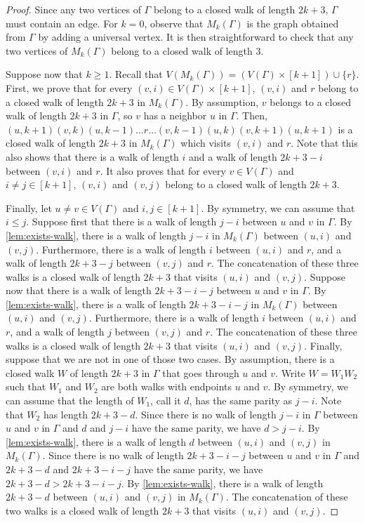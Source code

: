 \documentclass{article}
\begin{document}
\begin{proof}
    Since any two vertices of $\Gamma$ belong to a closed walk of length $2k+3$, $\Gamma$ must contain an edge.
    For $k = 0$, observe that $M_k(\Gamma)$ is the graph obtained from $\Gamma$ by adding a universal vertex. It is then straightforward to check that any two vertices of $M_k(\Gamma)$ belong to a closed walk of length $3$.

    Suppose now that $k \geq 1$. 
    Recall that $V(M_k(\Gamma)) = (V(\Gamma) \times [k+1]) \cup \{r\}$.
    First, we prove that for every $(v, i) \in V(\Gamma) \times [k+1]$, $(v, i)$ and $r$ belong to a closed walk of length $2k+3$ in $M_{k}(\Gamma)$.
    By assumption, $v$ belongs to a closed walk of length $2k+3$ in $\Gamma$, so $v$ has a neighbor $u$ in $\Gamma$.
    Then, $(u, k+1)(v, k)(u, k-1)\ldots r\ldots(v, k-1)(u, k)(v, k+1)(u, k+1)$ is a closed walk of length $2k+3$ in $M_k(\Gamma)$ which visits $(v, i)$ and $r$.
    Note that this also shows that there is a walk of length $i$ and a walk of length $2k+3-i$ between $(v, i)$ and $r$.
    It also proves that for every $v \in V(\Gamma)$ and $i \neq j \in [k+1]$, $(v, i)$ and $(v, j)$ belong to a closed walk of length $2k+3$.
    
    Finally, let $u \neq v \in V(\Gamma)$ and $i, j \in [k+1]$.
    By symmetry, we can assume that $i \leq j$.
    Suppose first that there is a walk of length $j-i$ between $u$ and $v$ in $\Gamma$.
    By \cref{lem:exists-walk}, there is a walk of length $j-i$ in $M_k(\Gamma)$ between $(u, i)$ and $(v, j)$.
    Furthermore, there is a walk of length $i$ between $(u, i)$ and $r$, and a walk of length $2k+3-j$ between $(v, j)$ and $r$. 
    The concatenation of these three walks is a closed walk of length $2k+3$ that visits $(u, i)$ and $(v, j)$.
    Suppose now that there is a walk of length $2k+3-i-j$ between $u$ and $v$ in $\Gamma$.
    By \cref{lem:exists-walk}, there is a walk of length $2k+3-i-j$ in $M_k(\Gamma)$ between $(u, i)$ and $(v, j)$.
    Furthermore, there is a walk of length $i$ between $(u, i)$ and $r$, and a walk of length $j$ between $(v, j)$ and $r$. 
    The concatenation of these three walks is a closed walk of length $2k+3$ that visits $(u, i)$ and $(v, j)$.
    Finally, suppose that we are not in one of those two cases.
    By assumption, there is a closed walk $W$ of length $2k+3$ in $\Gamma$ that goes through $u$ and $v$.
    Write $W = W_1W_2$ such that $W_1$ and $W_2$ are both walks with endpoints $u$ and $v$.
    By symmetry, we can assume that the length of $W_1$, call it $d$, has the same parity as $j-i$. Note that $W_2$ has length $2k+3-d$.
    Since there is no walk of length $j-i$ in $\Gamma$ between $u$ and $v$ in $\Gamma$ and $d$ and $j-i$ have the same parity, we have $d > j-i$.
    By \cref{lem:exists-walk}, there is a walk of length $d$ between $(u, i)$ and $(v, j)$ in $M_k(\Gamma)$.
    Since there is no walk of length $2k+3-i-j$ between $u$ and $v$ in $\Gamma$ and $2k+3-d$ and $2k+3-i-j$ have the same parity, we have $2k+3-d > 2k+3-i-j$.
    By \cref{lem:exists-walk}, there is a walk of length $2k+3-d$ between $(u, i)$ and $(v, j)$ in $M_k(\Gamma)$.
    The concatenation of these two walks is a closed walk of length $2k+3$ that visits $(u, i)$ and $(v, j)$.
\end{proof}
\end{document}
